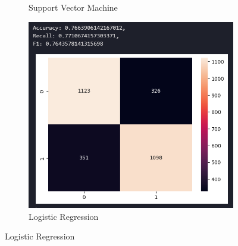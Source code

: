 \documentclass[12pt]{report}
\begin{document}
\begin{figure}[H]
\begin{subfigure}[b]{0.3\textwidth}
        \caption{Support Vector Machine}
        \label{fig:SVMSeen}
    \end{subfigure}
    \hfill
    \begin{subfigure}[b]{0.3\textwidth}
        \includegraphics[width=\textwidth]{ModelDev/Iteration1/Matrices/Seen/MetricsIncluded/LR.png}
        \caption{Logistic Regression}
        \label{fig:LRSeen}
    \end{subfigure}
    
    \vspace{1em}
    

\end{figure}
\end{document}
